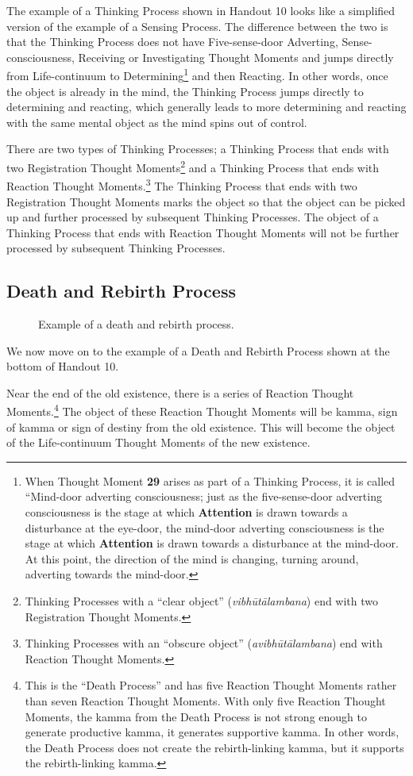 The example of a Thinking Process shown in Handout 10 looks like a simplified version of the example of a Sensing Process. The difference between the two is that the Thinking Process does not have Five-sense-door Adverting, Sense-consciousness, Receiving or Investigating Thought Moments and jumps directly from Life-continuum to Determining\footnote{When Thought Moment \textbf{29} arises as part of a Thinking Process, it is called “Mind-door adverting consciousness; just as the five-sense-door adverting consciousness is the stage at which \textbf{Attention} is drawn towards a disturbance at the eye-door, the mind-door adverting consciousness is the stage at which \textbf{Attention} is drawn towards a disturbance at the mind-door. At this point, the direction of the mind is changing, turning around, adverting towards the mind-door.} and then Reacting. In other words, once the object is already in the mind, the Thinking Process jumps directly to determining and reacting, which generally leads to more determining and reacting with the same mental object as the mind spins out of control.

There are two types of Thinking Processes; a Thinking Process that ends with two Registration Thought Moments\footnote{Thinking Processes with a “clear object” (\textit{vibhūtālambana}) end with two Registration Thought Moments.} and a Thinking Process that ends with Reaction Thought Moments.\footnote{Thinking Processes with an “obscure object” (\textit{avibhūtālambana}) end with Reaction Thought Moments.} The Thinking Process that ends with two Registration Thought Moments marks the object so that the object can be picked up and further processed by subsequent Thinking Processes. The object of a Thinking Process that ends with Reaction Thought Moments will not be further processed by subsequent Thinking Processes.

\subsection*{Death and Rebirth Process}

\begin{figure}[h]
\centering

\caption{Example of a death and rebirth process.}
\label{fig:Death}
\end{figure}

We now move on to the example of a Death and Rebirth Process shown at the bottom of Handout 10. 

Near the end of the old existence, there is a series of Reaction Thought Moments.\footnote{This is the “Death Process” and has five Reaction Thought Moments rather than seven Reaction Thought Moments. With only five Reaction Thought Moments, the kamma from the Death Process is not strong enough to generate productive kamma, it generates supportive kamma. In other words, the Death Process does not create the rebirth-linking kamma, but it supports the rebirth-linking kamma.} The object of these Reaction Thought Moments will be kamma, sign of kamma or sign of destiny from the old existence. This will become the object of the Life-continuum Thought Moments of the new existence. 

